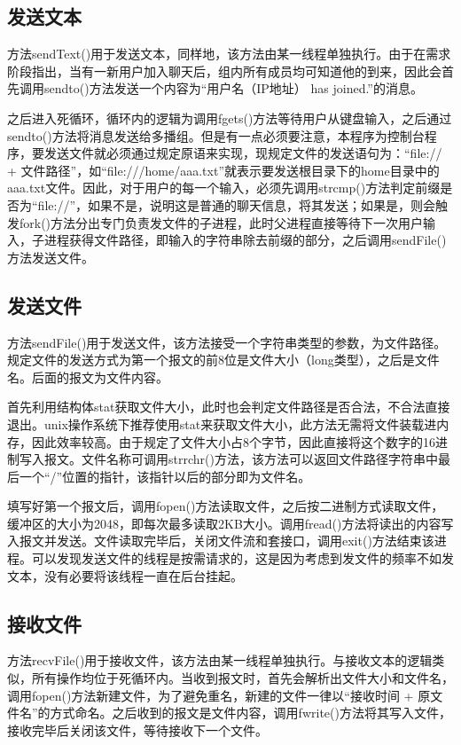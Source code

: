 \documentclass[UTF8]{ctexart}
\begin{document}
\subsection{发送文本}
方法sendText()用于发送文本，同样地，该方法由某一线程单独执行。由于在需求阶段指出，当有一新用户加入聊天后，组内所有成员均可知道他的到来，因此会首先调用sendto()方法发送一个内容为“用户名（IP地址） has joined.”的消息。
\par
之后进入死循环，循环内的逻辑为调用fgets()方法等待用户从键盘输入，之后通过sendto()方法将消息发送给多播组。但是有一点必须要注意，本程序为控制台程序，要发送文件就必须通过规定原语来实现，现规定文件的发送语句为：“file:// + 文件路径”，如“file:///home/aaa.txt”就表示要发送根目录下的home目录中的aaa.txt文件。因此，对于用户的每一个输入，必须先调用strcmp()方法判定前缀是否为“file://”，如果不是，说明这是普通的聊天信息，将其发送；如果是，则会触发fork()方法分出专门负责发文件的子进程，此时父进程直接等待下一次用户输入，子进程获得文件路径，即输入的字符串除去前缀的部分，之后调用sendFile()方法发送文件。
\subsection{发送文件}
方法sendFile()用于发送文件，该方法接受一个字符串类型的参数，为文件路径。规定文件的发送方式为第一个报文的前8位是文件大小（long类型），之后是文件名。后面的报文为文件内容。
\par
首先利用结构体stat获取文件大小，此时也会判定文件路径是否合法，不合法直接退出。unix操作系统下推荐使用stat来获取文件大小，此方法无需将文件装载进内存，因此效率较高。由于规定了文件大小占8个字节，因此直接将这个数字的16进制写入报文。文件名称可调用strrchr()方法，该方法可以返回文件路径字符串中最后一个“/”位置的指针，该指针以后的部分即为文件名。
\par
填写好第一个报文后，调用fopen()方法读取文件，之后按二进制方式读取文件，缓冲区的大小为2048，即每次最多读取2KB大小。调用fread()方法将读出的内容写入报文并发送。文件读取完毕后，关闭文件流和套接口，调用exit()方法结束该进程。可以发现发送文件的线程是按需请求的，这是因为考虑到发文件的频率不如发文本，没有必要将该线程一直在后台挂起。
\subsection{接收文件}
方法recvFile()用于接收文件，该方法由某一线程单独执行。与接收文本的逻辑类似，所有操作均位于死循环内。当收到报文时，首先会解析出文件大小和文件名，调用fopen()方法新建文件，为了避免重名，新建的文件一律以“接收时间 + 原文件名”的方式命名。之后收到的报文是文件内容，调用fwrite()方法将其写入文件，接收完毕后关闭该文件，等待接收下一个文件。
\end{document}
